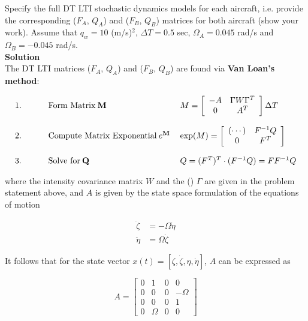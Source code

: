 \documentclass[]{article}
\begin{document}
\noindent Specify the full DT LTI stochastic dynamics models for each aircraft, i.e. provide the corresponding ($F_A$, $Q_A$) and ($F_B$, $Q_B$) matrices for both aircraft (show your work). Assume that $q_w = 10$ (m/s)$^2$, $\Delta T = 0.5$ sec, $\Omega_A = 0.045$ rad/s and $\Omega_B = -0.045$ rad/s.\\

\noindent\textbf{Solution}\\
\noindent The DT LTI matrices ($F_A$, $Q_A$) and ($F_B$, $Q_B$) are found via \textbf{Van Loan's method}:

\begin{eqnarray}
	\begin{tabular}{lll}
		1.$\qquad$ & $\text{Form Matrix}\:\mathbf{M}$ &$ M = \left[\begin{array}{cc} -A & \Gamma W \Gamma^T\\ 0 & A^T\end{array}\right]\Delta T$\\ \\
		2.$\qquad$ & $\text{Compute Matrix Exponential}\:e^{\mathbf{M}}$ &  $\exp(M) = \left[\begin{array}{cc} (\cdots) & F^{-1}Q\\ 0 & F^T\end{array}\right]$\\ \\
		3.$\qquad$ & $\text{Solve for}\:\mathbf{Q}$ & $Q = (F^T)^T \cdot (F^{-1}Q) = FF^{-1}Q$
	\end{tabular}
\end{eqnarray}

\noindent where the intensity covariance matrix $W$ and the (\textcolor{red}{}) $\Gamma$ are given in the problem statement above, and $A$ is given by the state space formulation of the equations of motion

\begin{equation}
\begin{aligned}
\ddot{\zeta} &= -\Omega\dot{\eta} \\
\ddot{\eta} &= \Omega\dot{\zeta}
\end{aligned}
\end{equation}

\noindent It follows that for the state vector $x(t) = \left[\zeta, \dot{\zeta}, \eta, \dot{\eta}\right]$, $A$ can be expressed as

$$ 
A = \left[\begin{array}{cccc}
0 & 1      & 0 & 0\\
0 & 0      & 0 & -\Omega\\
0 & 0      & 0 & 1\\ 
0 & \Omega & 0 & 0
\end{array}\right]
$$
\end{document}
